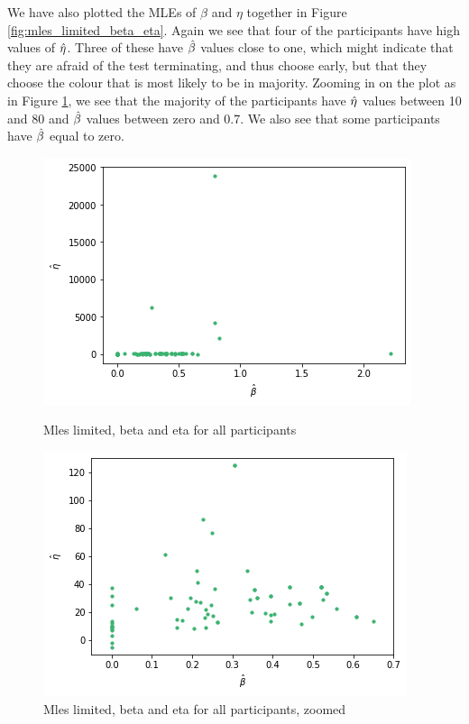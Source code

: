 We have also plotted the MLEs of $\beta$ and $\eta$ together in Figure \ref{fig:mles_limited_beta_eta}. Again we see that four of the participants have high values of $\hat{\eta}$. Three of these have $\hat{\beta}$ values close to one, which might indicate that they are afraid of the test terminating, and thus choose early, but that they choose the colour that is most likely to be in majority. Zooming in on the plot as in Figure \ref{fig:mles_limited_beta_eta_zoomed}, we see that the majority of the participants have $\hat{\eta}$ values between 10 and 80 and $\hat{\beta}$ values between zero and 0.7. We also see that some participants have $\hat{\beta}$ equal to zero. 
\begin{figure}
    \centering
    \begin{minipage}{0.48\textwidth}
        \centering
        \includegraphics[scale=0.38]{pictures/plotted_mles_limited_beta_eta_gk1.png}
        \caption{Mles limited, beta and eta for all participants}
        \label{fig:mles_limited_beta_eta}
    \end{minipage}
    \hfill
    \begin{minipage}{0.48\textwidth}
        \centering
        \includegraphics[scale=0.38]{pictures/plotted_mles_limited_beta_eta_zoomed_gk1.png}
        \caption{Mles limited, beta and eta for all participants, zoomed}
        \label{fig:mles_limited_beta_eta_zoomed}
    \end{minipage}
\end{figure}



